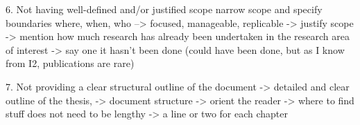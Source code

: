 6. Not having well-defined and/or justified scope
narrow scope and specify boundaries
where, when, who --> focused, manageable, replicable
-> justify scope
-> mention how much research has already been undertaken in the research area of interest
-> say one it hasn't been done (could have been done, but as I know from I2, publications are rare)

7. Not providing a clear structural outline of the document
-> detailed and clear outline of the thesis, -> document structure -> orient the reader -> where to find stuff
does not need to be lengthy -> a line or two for each chapter







